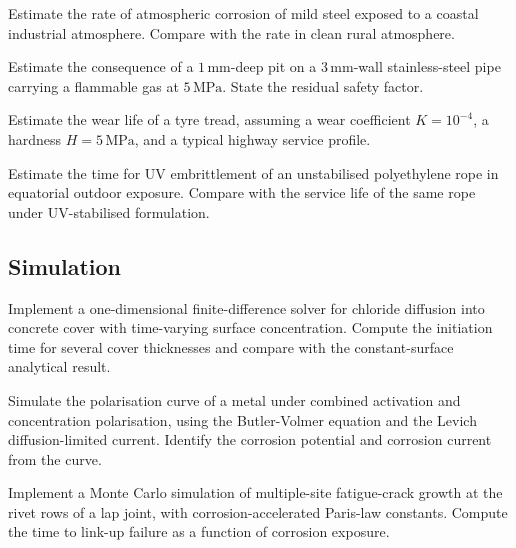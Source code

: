 \begin{exercise}
Estimate the rate of atmospheric corrosion of mild steel exposed
to a coastal industrial atmosphere. Compare with the rate in clean
rural atmosphere.
\end{exercise}

\begin{exercise}
Estimate the consequence of a $1\,\text{mm}$-deep pit on a
$3\,\text{mm}$-wall stainless-steel pipe carrying a flammable gas at
$5\,\text{MPa}$. State the residual safety factor.
\end{exercise}

\begin{exercise}
Estimate the wear life of a tyre tread, assuming a wear coefficient
$K = 10^{-4}$, a hardness $H = 5\,\text{MPa}$, and a typical highway
service profile.
\end{exercise}

\begin{exercise}
Estimate the time for UV embrittlement of an unstabilised
polyethylene rope in equatorial outdoor exposure. Compare with the
service life of the same rope under UV-stabilised formulation.
\end{exercise}

\subsection*{Simulation}

\begin{exercise}
Implement a one-dimensional finite-difference solver for chloride
diffusion into concrete cover with time-varying surface concentration.
Compute the initiation time for several cover thicknesses and compare
with the constant-surface analytical result.
\end{exercise}

\begin{exercise}
Simulate the polarisation curve of a metal under combined activation
and concentration polarisation, using the Butler-Volmer equation and
the Levich diffusion-limited current. Identify the corrosion potential
and corrosion current from the curve.
\end{exercise}

\begin{exercise}
Implement a Monte Carlo simulation of multiple-site fatigue-crack
growth at the rivet rows of a lap joint, with corrosion-accelerated
Paris-law constants. Compute the time to link-up failure as a function
of corrosion exposure.
\end{exercise}

